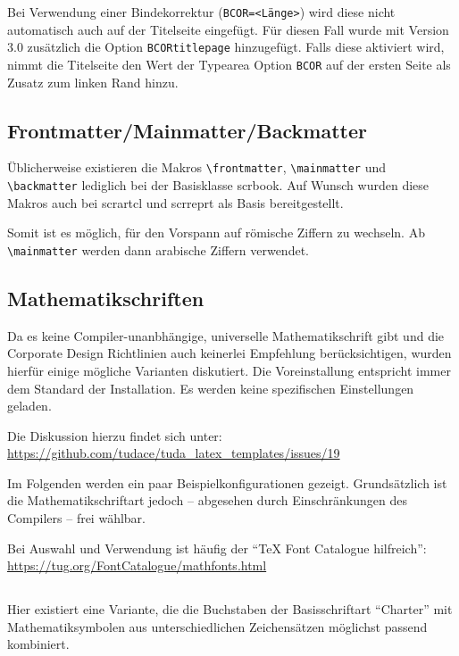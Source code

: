 \documentclass[
	german,%
	accentcolor=9c,%
]{tudapub}
\newcommand*{\code}[1]{\texttt{#1}}
\newcommand*{\cls}[1]{\textsf{#1}}
\begin{document}
Bei Verwendung einer Bindekorrektur (\code{BCOR=<Länge>}) wird diese nicht automatisch auch auf der Titelseite eingefügt. Für diesen Fall wurde mit Version 3.0 zusätzlich die Option \code{BCORtitlepage} hinzugefügt. Falls diese aktiviert wird, nimmt die Titelseite den Wert der Typearea Option \code{BCOR} auf der ersten Seite als Zusatz zum linken Rand hinzu.

\subsection{Frontmatter/Mainmatter/Backmatter}
Üblicherweise existieren die Makros \verb+\frontmatter+, \verb+\mainmatter+ und \verb+\backmatter+ lediglich bei der Basisklasse \cls{scrbook}.
Auf Wunsch wurden diese Makros auch bei \cls{scrartcl} und \cls{scrreprt} als Basis bereitgestellt.

Somit ist es möglich, für den Vorspann auf römische Ziffern zu wechseln. Ab \verb+\mainmatter+ werden dann arabische Ziffern verwendet.

\subsection{Mathematikschriften}
Da es keine Compiler-unanbhängige, universelle Mathematikschrift gibt und die Corporate Design Richtlinien auch keinerlei Empfehlung berücksichtigen, wurden hierfür einige mögliche Varianten diskutiert. Die Voreinstallung entspricht immer dem Standard der Installation. Es werden keine spezifischen Einstellungen geladen.

Die Diskussion hierzu findet sich unter:\\
\url{https://github.com/tudace/tuda_latex_templates/issues/19}

Im Folgenden werden ein paar Beispielkonfigurationen gezeigt. Grundsätzlich ist die Mathematikschriftart jedoch -- abgesehen durch Einschränkungen des Compilers -- frei wählbar.

Bei Auswahl und Verwendung ist häufig der \enquote{\TeX{} Font Catalogue hilfreich}: \url{https://tug.org/FontCatalogue/mathfonts.html}

\subsection{}
Hier existiert eine Variante, die die Buchstaben der Basisschriftart \enquote{Charter} mit Mathematiksymbolen aus unterschiedlichen Zeichensätzen möglichst passend kombiniert.
\end{document}
